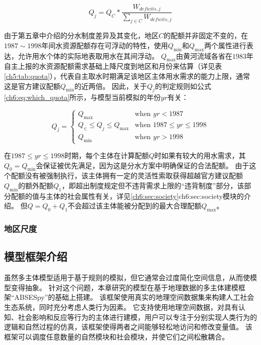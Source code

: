 \begin{equation}
    \label{ch6:eq:quota}
    Q_j = Q_{C} * \frac{W_{deficits, j}}{\sum_{j \in C} W_{deficits, j}}
\end{equation}

由于第五章中介绍的分水制度差异及其变化，地区$C$的配额并非固定不变的，在$1987 \sim 1998$年间水资源配额存在可浮动的特性，使用$Q_{\min}$和$Q_{\max}$两个属性进行表达，允许用水个体的实际地表取用水在其间浮动。
$Q_{\max}$由黄河流域各省在$1983$年自主上报的水资源配额需求基础上降尺度到地区和月份来估算（详见表\ref{ch5:tab:quota}），代表自主取水时期满足该地区主体用水需求的能力上限，通常这是官方建议配额$Q_{\min}$的近两倍。
因此，关于$Q_j$的判定规则如公式\ref{ch6:eq:which_quota}所示，与模型当前模拟的年份$yr$有关：

\begin{equation}
    \label{ch6:eq:which_quota}
    Q_j =
    \begin{cases}
        Q_{\max} & \text{when } yr < 1987 \\
        Q_{\in} \leq Q_j \leq Q_{\max} & \text{when } 1987 \leq yr \leq 1998 \\
        Q_{\min} & \text{when } yr > 1998
    \end{cases}
\end{equation}

在$1987 \leq yr \leq 1998$时期，每个主体在计算配额$Q$时如果有较大的用水需求，其$Q_{0} = Q_{\min}$会保证被优先满足，因为这是分水方案中明确保证的合法配额。
由于这个配额没有被强制执行，该主体拥有一定的灵活性索取获得超越官方建议配额$Q_{\min}$的额外配额$Q_{1}$，即超出制度规定但不违背需求上限的“违背制度”部分，该部分配额的值与主体的社会属性有关，详见\ref{ch6:sec:society}\refname{ch6:sec:society}模块的介绍。
但$Q = Q_{0} + Q_{1}$不会超过该主体能被分配到的最大合理配额$Q_{\max}$。

\subsubsection*{地区尺度}

\subsection{模型框架介绍}

虽然多主体模型适用于基于规则的模拟，但它通常会过度简化空间信息，从而使模型变得抽象。
针对这个问题，本章研究的模型在基于地理数据的多主体建模框架“ABSESpy”的基础上搭建。
该框架使用真实的地理空间数据集来构建人工社会生态系统，同时充分考虑人类行为因素。
它支持使用地理空间数据，对具有认知、社会影响和反应等行为的主体进行建模，用户可以专注于分别实现人类行为的逻辑和自然过程的仿真，该框架使得两者之间能够轻松地访问和修改变量值。
该框架可以调度任意数量的自然模块和社会模块，并使它们之间松散耦合。

